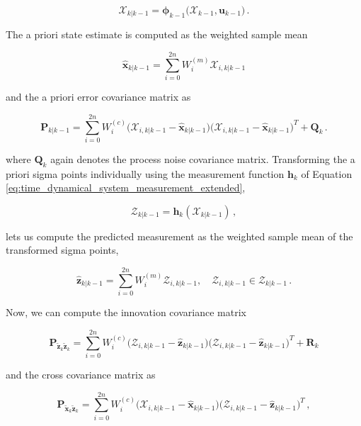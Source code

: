 \begin{equation}
  \bm{\mathcal{X}}_{k|k-1} = \bm{\phi}_{k-1}\big(\bm{\mathcal{X}}_{k-1}, \bm{u}_{k-1}\big)\,.
\end{equation}

\noindent
The a priori state estimate is computed as the weighted sample mean

\begin{equation}\label{eq:aprioriunscented}
  \hat{\bm{x}}_{k|k-1} = \sum^{2n}_{i = 0} W_i^{(m)} \mathcal{X}_{i, k|k-1}
\end{equation}

\noindent
and the a priori error covariance matrix as

\begin{equation}
  \bm{P}_{k|k-1} = \sum^{2n}_{i = 0} W_i^{(c)} \big(\mathcal{X}_{i, k|k-1} -\hat{\bm{x}}_{k|k-1}\big)\big(\mathcal{X}_{i, k|k-1}-\hat{\bm{x}}_{k|k-1}\big)^T + \bm{Q}_k\,.
\end{equation}

\noindent
where $\bm{Q}_k$ again denotes the process noise covariance matrix. Transforming the a priori sigma points individually using the measurement function $\bm{h}_{k}$ of Equation \ref{eq:time_dynamical_system_measurement_extended},

\begin{equation}
  \bm{\mathcal{Z}}_{k|k-1} = \bm{h}_{k}(\bm{\mathcal{X}}_{k|k-1})\,,
\end{equation}

\noindent
lets us compute the predicted measurement as the weighted sample mean of the transformed sigma points,

\begin{equation}\label{eq:innovation_covariance}
  \hat{\bm{z}}_{k|k-1} = \sum^{2n}_{i = 0} W_i^{(m)} \mathcal{Z}_{i, k|k-1}, \quad \mathcal{Z}_{i, k|k-1} \in \bm{\mathcal{Z}}_{k|k-1}\,.
\end{equation}


Now, we can compute the innovation covariance matrix

\begin{equation}\label{eq:cross_covariance}
  \bm{P}_{\tilde{\bm{z}}_k \tilde{\bm{z}}_k} = \sum^{2n}_{i = 0} W_i^{(c)} \big(\mathcal{Z}_{i, k|k-1} -\hat{\bm{z}}_{k|k-1}\big)\big(\mathcal{Z}_{i, k|k-1}-\hat{\bm{z}}_{k|k-1}\big)^T + \bm{R}_k
\end{equation}

\noindent
and the cross covariance matrix as

\begin{equation}\label{eq:crosscovunscented}
  \bm{P}_{\tilde{\bm{x}}_k \tilde{\bm{z}}_k} = \sum^{2n}_{i = 0} W_i^{(c)} \big(\mathcal{X}_{i, k|k-1} -\hat{\bm{x}}_{k|k-1}\big)\big(\mathcal{Z}_{i, k|k-1}-\hat{\bm{z}}_{k|k-1}\big)^T\,,
\end{equation}

